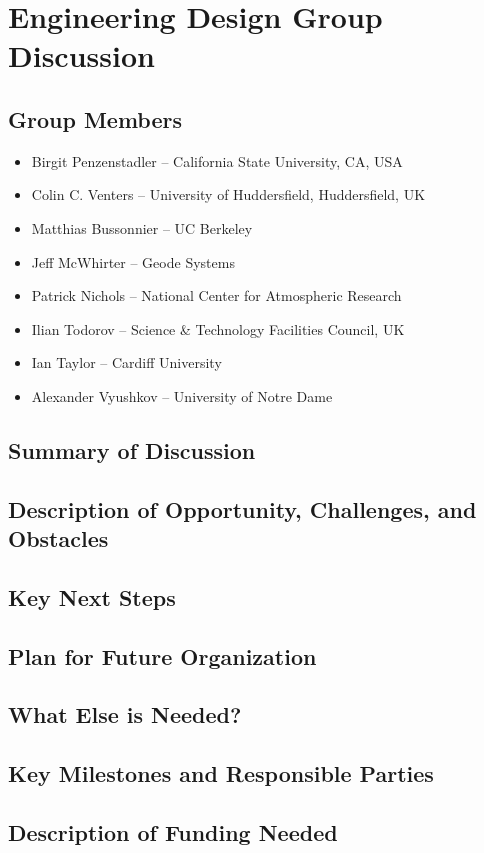 \section{Engineering Design Group Discussion}
\label{sec:appendix_eng_design}


\subsection{Group Members}

\begin{itemize}
\item Birgit Penzenstadler -- California State University, CA, USA
\item Colin C. Venters -- University of Huddersfield, Huddersfield, UK
\item Matthias Bussonnier -- UC Berkeley
\item Jeff McWhirter -- Geode Systems
\item Patrick Nichols -- National Center for Atmospheric Research
\item Ilian Todorov -- Science \& Technology Facilities Council, UK\\
\item Ian Taylor -- Cardiff University
\item Alexander Vyushkov -- University of Notre Dame

\end{itemize}

\subsection{Summary of Discussion}

\subsection{Description of Opportunity, Challenges, and Obstacles}

\subsection{Key Next Steps}


\subsection{Plan for Future Organization}


\subsection{What Else is Needed?}


\subsection{Key Milestones and Responsible Parties}


\subsection{Description of Funding Needed}
